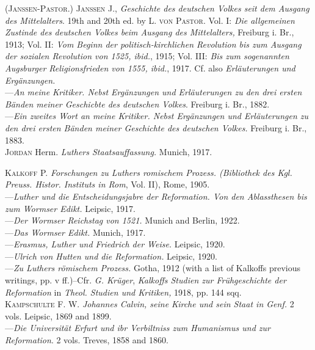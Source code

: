 (\textsc{Janssen-Pastor.}) \textsc{Janssen J.}, \textit{Geschichte des deutschen Volkes seit dem
Ausgang des Mittelalters}. 19th and 20th ed. by \textsc{L. von Pastor}. Vol. I: \textit{Die
allgemeinen Zustinde des deutschen Volkes beim Ausgang des Mittelalters,}
Freiburg i. Br., 1913; Vol. II: \textit{Vom Beginn der politisch-kirchlichen Revolution
bis zum Ausgang der sozialen Revolution von 1525, ibid.}, 1915;
Vol. III: \textit{Bis zum sogenannten Augsburger Religionsfrieden von 1555, ibid.},
1917. Cf. also \textit{Erläuterungen und Ergänzungen.} \\
---\textit{An meine Kritiker. Nebst Ergänzungen und Erläuterungen zu den
drei ersten Bänden meiner Geschicbte des deutschen Volkes}. Freiburg i.
Br., 1882. \\
---\textit{Ein zweites Wort an meine Kritiker. Nebst Ergänzungen und Erläuterungen
	zu den drei ersten Bänden meiner Geschichte des deutschen
Volkes.} Freiburg i. Br., 1883. \\

\textsc{Jordan} Herm. \textit{Luthers Staatsauffassung.} Munich, 1917.

\textsc{Kalkoff P.} \textit{Forschungen zu Luthers romischem Prozess. (Bibliothek des
Kgl. Preuss. Histor. Instituts in Rom}, Vol. II), Rome, 1905. \\
---\textit{Luther und die Entscheidungsjabre der Reformation. Von den Ablassthesen
bis zum Wormser Edikt.} Leipsic, 1917. \\
---\textit{Der Wormser Reichstag von 1521.} Munich and Berlin, 1922. \\
---\textit{Das Wormser Edikt.} Munich, 1917. \\
---\textit{Erasmus, Luther und Friedrich der Weise.} Leipsic, 1920. \\
---\textit{Ulrich von Hutten und die Reformation.} Leipsic, 1920. \\
---\textit{Zu Luthers römischem Prozess.} Gotha, 1912 (with a list of Kalkoffs
previous writings, pp. v ff.)--Cfr. \textit{G. Krüger}, \textit{Kalkoffs Studien zur
Frühgeschichte der Reformation} in \textit{Theol. Studien und Kritiken,} 1918,
pp. 144 sqq. \\

\textsc{Kampschulte F. W.} \textit{Johannes Calvin, seine Kirche und sein Staat in Genf.}
2 vols. Leipsic, 1869 and 1899. \\
---\textit{Die Universität Erfurt und ibr Verbiltniss zum Humanismus und
zur Reformation}. 2 vols. Treves, 1858 and 1860. \\

